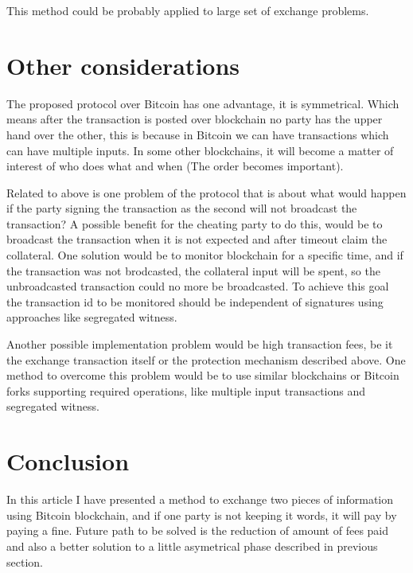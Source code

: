 \documentclass[]{article}
\begin{document}
This method could be probably applied to large set of exchange problems.

\section{Other considerations}

The proposed protocol over Bitcoin has one advantage, it is symmetrical. Which means after the transaction is posted over blockchain no party has the upper hand over the other, this is because in Bitcoin we can have transactions which can have multiple inputs. In some other blockchains, it will become a matter of interest of who does what and when (The order becomes important).

Related to above is one problem of the protocol that is about what would happen if the party signing the transaction as the second will not broadcast the transaction? A possible benefit for the cheating party to do this, would be to broadcast the transaction when it is not expected and after timeout claim the collateral. One solution would be to monitor blockchain for a specific time, and if the transaction was not brodcasted, the collateral input will be spent, so the unbroadcasted transaction could no more be broadcasted. To achieve this goal the transaction id to be monitored should be independent of signatures using approaches like segregated witness\cite{segwit}.

Another possible implementation problem would be high transaction fees, be it the exchange transaction itself or the protection mechanism described above. One method to overcome this problem would be to use similar blockchains or Bitcoin forks supporting required operations, like multiple input transactions and segregated witness.

\section{Conclusion}

In this article I have presented a method to exchange two pieces of information using Bitcoin blockchain, and if one party is not keeping it words, it will pay by paying a fine. Future path to be solved is the reduction of amount of fees paid and also a better solution to a little asymetrical phase described in previous section.
\end{document}
